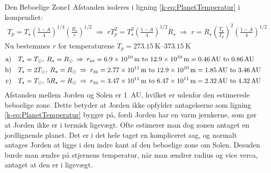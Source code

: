 %
%
\begin{opgave}{Den Beboelige Zone}{1}
Afstanden isoleres i ligning \ref{k-eq:PlanetTemperatur} i kompendiet:
\begin{align*}
    T_p = T_\star\left(\frac{1-A}{4}\right)^{1/4}\left(\frac{R_\star}{r}\right)^{1/2} \;\Rightarrow\; rT_p^2 = T_\star^2\left(\frac{1-A}{4}\right)^{1/2}R_\star \;\Rightarrow\; r = R_\star\left(\frac{T_\star}{T_p}\right)^2 \left(\frac{1-A}{4}\right)^{1/2}
\end{align*}
\opg Nu bestemmes $r$ for temperaturene $T_p = \SIrange{273.15}{373.15}{\kelvin}$
\begin{align*}
    \mathrm{a) } \quad &T_\star = T_\odot, \: R_\star = R_\odot \: \Rightarrow \: r_\textsc{bz} = \SIrange{6,9e10}{12,9e10}{\metre} = \SIrange{,46}{,86}{AU} \\
    \mathrm{b)} \quad &T_\star = 2T_\odot, \: R_\star = R_\odot \: \Rightarrow \: r_\textsc{bz} = \SIrange{2.77e11}{12,9e10}{\metre} = \SIrange{1.85}{3.46}{AU} \\
    \mathrm{c)} \quad &T_\star = T_\odot, \: 5R_\star = R_\odot \: \Rightarrow \: r_\textsc{bz} = \SIrange{3.47e11}{6.47e11}{\metre} = \SIrange{2.32}{4.32}{AU} \\    
\end{align*}
\opg Afstanden mellem Jorden og Solen er \SI{1}{AU}, hvilket er udenfor den estimerede beboelige zone. Dette betyder at Jorden ikke opfylder antagelserne som ligning \ref{k-eq:PlanetTemperatur} bygger på, fordi Jorden har en varm jernkerne, som gør at Jorden ikke er i termisk ligevægt. Ofte estimerer man dog zonen antaget en jordlignende planet. Det er i det hele taget en kompliceret sag, og normalt antages Jorden at ligge i den indre kant af den beboelige zone om Solen. Desuden burde man ændre på stjernens temperatur, når man ændrer radius og vice verca, antaget at den er i ligevægt. 
\end{opgave}
%
%
